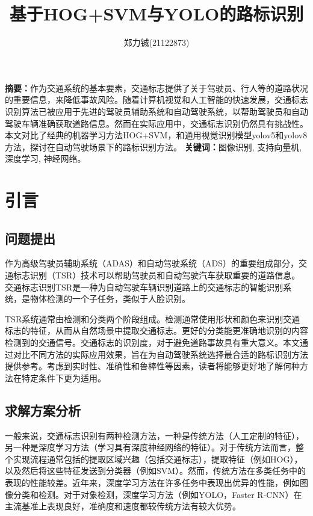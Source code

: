 \documentclass{article}
\title{\textbf{基于HOG+SVM与YOLO的路标识别}}
\author{
郑力铖(21122873)
}
\begin{document}
 \songti


\date{}
\maketitle


\begin{center}
    \setlength{\textwidth}{15cm}
    \parbox{\textwidth}{
        \textbf{摘要：}作为交通系统的基本要素，交通标志提供了关于驾驶员、行人等的道路状况的重要信息，来降低事故风险。随着计算机视觉和人工智能的快速发展，交通标志识别算法已被应用于先进的驾驶员辅助系统和自动驾驶系统，以帮助驾驶员和自动驾驶车辆准确获取道路信息。然而在实际应用中，交通标志识别仍然具有挑战性。本文对比了经典的机器学习方法HOG+SVM，和通用视觉识别模型yolov5和yolov8方法，探讨在自动驾驶场景下的路标识别方法。
        \newline
        \textbf{关键词：}图像识别, 支持向量机, 深度学习, 神经网络。
    }
\end{center}

\section{引言}
\subsection{问题提出}
作为高级驾驶员辅助系统（ADAS）和自动驾驶系统（ADS）的重要组成部分，交通标志识别（TSR）技术可以帮助驾驶员和自动驾驶汽车获取重要的道路信息。交通标志识别TSR是一种为自动驾驶车辆识别道路上的交通标志的智能识别系统，是物体检测的一个子任务，类似于人脸识别。

TSR系统通常由检测和分类两个阶段组成。检测通常使用形状和颜色来识别交通标志的特征，从而从自然场景中提取交通标志。更好的分类能更准确地识别的内容检测到的交通信号。交通标志的识别度，对于避免道路事故具有重大意义\cite{Zhang2017}。本文通过对比不同方法的实际应用效果，旨在为自动驾驶系统选择最合适的路标识别方法提供参考。考虑到实时性、准确性和鲁棒性等因素，读者将能够更好地了解何种方法在特定条件下更为适用。

\subsection{求解方案分析}
一般来说，交通标志识别有两种检测方法，一种是传统方法（人工定制的特征），另一种是深度学习方法（学习具有深度神经网络的特征）。对于传统方法而言，整个实现流程通常包括的提取区域兴趣（包括交通标志），提取特征（例如HOG），以及然后将这些特征发送到分类器（例如SVM）。然而，传统方法在多类任务中的表现的性能较差。近年来，深度学习方法在许多任务中表现出优异的性能，例如图像分类和检测。对于对象检测，深度学习方法（例如YOLO\cite{ref9}，Faster R-CNN\cite{Ren2016}）在主流基准上表现良好，准确度和速度都较传统方法有较大优势。
\end{document}
